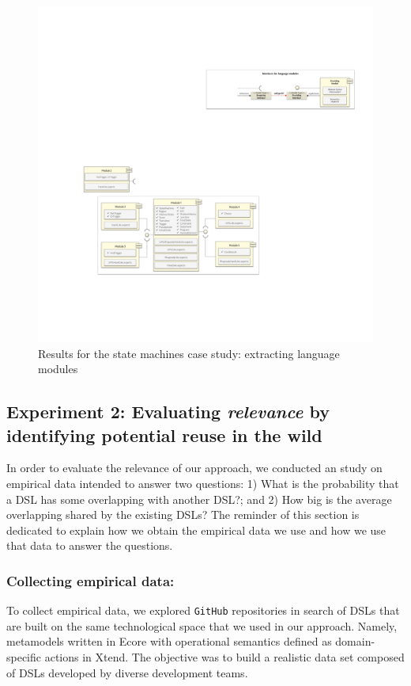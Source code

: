 \begin{figure}[h!]
\centering
\includegraphics[width=1\linewidth]{images/puzzle-modularization.pdf}
\caption{Results for the state machines case study: extracting language modules}
\label{fig:puzzle-modularization}
\end{figure}

\subsection{Experiment 2: Evaluating \textit{relevance} by identifying potential reuse in the wild}

In order to evaluate the relevance of our approach, we conducted an study on empirical data intended to answer two questions: 1) What is the probability that a DSL has some overlapping with another DSL?; and 2) How big is the average overlapping shared by the existing DSLs? The reminder of this section is dedicated to explain how we obtain the empirical data we use and how we use that data to answer the questions. 
\vspace{-3mm}
\subsubsection{Collecting empirical data:} To collect empirical data, we explored \texttt{GitHub} repositories in search of DSLs that are built on the same technological space that we used in our approach. Namely, metamodels written in Ecore with operational semantics defined as domain-specific actions in Xtend. The objective was to build a realistic data set composed of DSLs developed by diverse development teams. 

